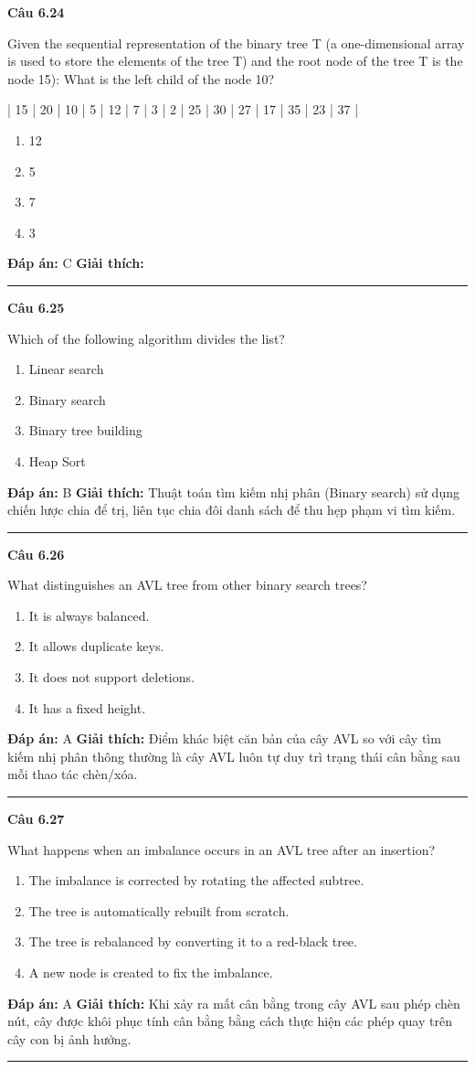 \documentclass[11pt,a4paper]{article}
\newenvironment{question}[1]{%
  \par\vspace{1em}\noindent\textbf{\large Câu #1}\par\vspace{0.4em}
}{%
  \par\vspace{1em}\hrule\vspace{0.6em}
}
\newenvironment{choices}{%
  \begin{enumerate}[label=\textbf{\Alph*.},leftmargin=2.2em,itemsep=2pt,topsep=3pt]
}{%
  \end{enumerate}
}
\newcommand{\choice}{\item}
\begin{document}
\begin{question}{6.24}
Given the sequential representation of the binary tree T (a one-dimensional array is used to store the elements of the tree T) and the root node of the tree T is the node 15): What is the left child of the node 10?

| 15 | 20 | 10 | 5 | 12 | 7 | 3 | 2 | 25 | 30 | 27 | 17 | 35 | 23 | 37 |
\begin{choices}
\choice 12
\choice 5
\choice 7
\choice 3
\end{choices}
\textbf{Đáp án:} C
\textbf{Giải thích:} 
\end{question}

\begin{question}{6.25}
Which of the following algorithm divides the list?
\begin{choices}
\choice Linear search
\choice Binary search
\choice Binary tree building
\choice Heap Sort
\end{choices}
\textbf{Đáp án:} B
\textbf{Giải thích:} Thuật toán tìm kiếm nhị phân (Binary search) sử dụng chiến lược chia để trị, liên tục chia đôi danh sách để thu hẹp phạm vi tìm kiếm.
\end{question}

\begin{question}{6.26}
What distinguishes an AVL tree from other binary search trees?
\begin{choices}
\choice It is always balanced.
\choice It allows duplicate keys.
\choice It does not support deletions.
\choice It has a fixed height.
\end{choices}
\textbf{Đáp án:} A
\textbf{Giải thích:} Điểm khác biệt căn bản của cây AVL so với cây tìm kiếm nhị phân thông thường là cây AVL luôn tự duy trì trạng thái cân bằng sau mỗi thao tác chèn/xóa.
\end{question}

\begin{question}{6.27}
What happens when an imbalance occurs in an AVL tree after an insertion?
\begin{choices}
\choice The imbalance is corrected by rotating the affected subtree.
\choice The tree is automatically rebuilt from scratch.
\choice The tree is rebalanced by converting it to a red-black tree.
\choice A new node is created to fix the imbalance.
\end{choices}
\textbf{Đáp án:} A
\textbf{Giải thích:} Khi xảy ra mất cân bằng trong cây AVL sau phép chèn nút, cây được khôi phục tính cân bằng bằng cách thực hiện các phép quay trên cây con bị ảnh hưởng.
\end{question}
\end{document}
